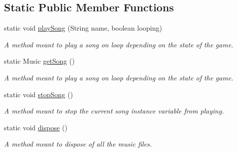 \subsection*{Static Public Member Functions}
\begin{DoxyCompactItemize}
\item 
static void \hyperlink{classnl_1_1arjanfrans_1_1mario_1_1audio_1_1Audio_aaadf4a3f91b5908a1e73c7dab8f15c00}{play\+Song} (String name, boolean looping)
\begin{DoxyCompactList}\small\item\em A method meant to play a song on loop depending on the state of the game. \end{DoxyCompactList}\item 
static Music \hyperlink{classnl_1_1arjanfrans_1_1mario_1_1audio_1_1Audio_adb8068907967606c1f2cf680e04afaa3}{get\+Song} ()
\begin{DoxyCompactList}\small\item\em A method meant to play a song on loop depending on the state of the game. \end{DoxyCompactList}\item 
\mbox{\label{classnl_1_1arjanfrans_1_1mario_1_1audio_1_1Audio_a47a221faf6b2c56402c95720bf46ad70}} 
static void \hyperlink{classnl_1_1arjanfrans_1_1mario_1_1audio_1_1Audio_a47a221faf6b2c56402c95720bf46ad70}{stop\+Song} ()
\begin{DoxyCompactList}\small\item\em A method meant to stop the current song instance variable from playing. \end{DoxyCompactList}\item 
\mbox{\label{classnl_1_1arjanfrans_1_1mario_1_1audio_1_1Audio_ae9e32f01c3273c8d0e30a109602af1d4}} 
static void \hyperlink{classnl_1_1arjanfrans_1_1mario_1_1audio_1_1Audio_ae9e32f01c3273c8d0e30a109602af1d4}{dispose} ()
\begin{DoxyCompactList}\small\item\em A method meant to dispose of all the music files. \end{DoxyCompactList}\end{DoxyCompactItemize}
